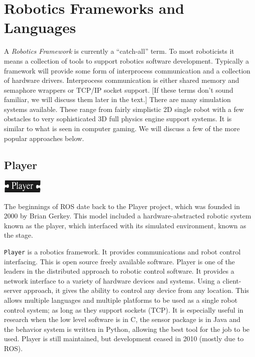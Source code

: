 \hypertarget{robotics-frameworks-and-languages}{%
\section{Robotics Frameworks and
Languages}\label{robotics-frameworks-and-languages}}

A \emph{Robotics Framework} is currently a ``catch-all'' term. To most
roboticists it means a collection of tools to support robotics software
development. Typically a framework will provide some form of
interprocess communication and a collection of hardware drivers.
Interprocess communication is either shared memory and semaphore
wrappers or TCP/IP socket support. {[}If these terms don't sound
familiar, we will discuss them later in the text.{]} There are many
simulation systems available. These range from fairly simplistic 2D
single robot with a few obstacles to very sophisticated 3D full physics
engine support systems. It is similar to what is seen in computer
gaming. We will discuss a few of the more popular approaches below.

\hypertarget{player}{%
\subsection{Player}\label{player}}

\includegraphics[width=0.15\textwidth,height=\textheight]{ToolsFigures/player_button_v3.png}

The beginnings of ROS date back to the Player project, which was founded
in 2000 by Brian Gerkey. This model included a hardware-abstracted
robotic system known as the player, which interfaced with its simulated
environment, known as the stage.

\texttt{Player} is a robotics framework. It provides communications and
robot control interfacing. This is open source freely available
software. Player is one of the leaders in the distributed approach to
robotic control software. It provides a network interface to a variety
of hardware devices and systems. Using a client-server approach, it
gives the ability to control any device from any location. This allows
multiple languages and multiple platforms to be used as a single robot
control system; as long as they support sockets (TCP). It is especially
useful in research when the low level software is in C, the sensor
package is in Java and the behavior system is written in Python,
allowing the best tool for the job to be used. Player is still
maintained, but development ceased in 2010 (mostly due to ROS).

